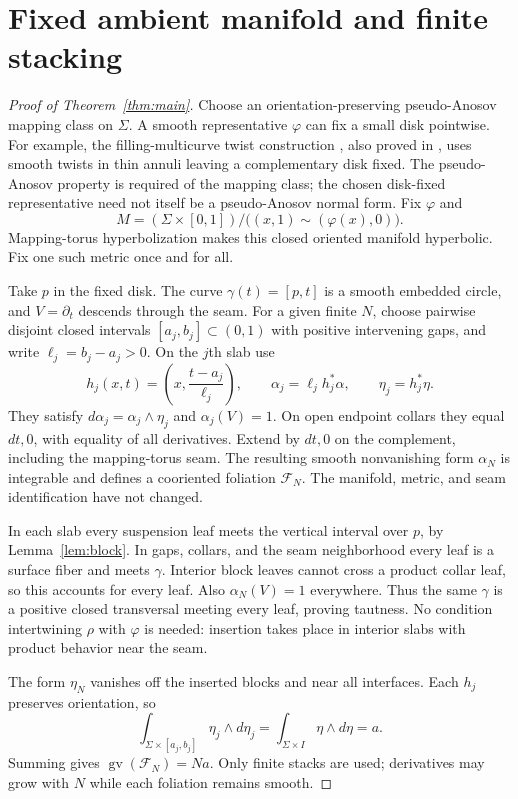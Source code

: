 \documentclass[11pt]{article}
\newcommand{\GV}{\operatorname{gv}}
\begin{document}
\section{Fixed ambient manifold and finite stacking}
\begin{proof}[Proof of Theorem~\ref{thm:main}]
Choose an orientation-preserving pseudo-Anosov mapping class on $\Sigma$.
A smooth representative $\varphi$ can fix a small disk pointwise.
For example, the filling-multicurve twist construction
\cite[Theorem~3.1]{P88}, also proved in \cite[pp.~467--468]{F92},
uses smooth twists in thin annuli leaving a complementary disk fixed.
The pseudo-Anosov property is required of the mapping class; the chosen
disk-fixed representative need not itself be a pseudo-Anosov normal form.
Fix $\varphi$ and
\[
 M=(\Sigma\times[0,1])/\bigl((x,1)\sim(\varphi(x),0)\bigr).
\]
Mapping-torus hyperbolization \cite[Theorem~0.1, Proposition~2.6,
\S5]{Th98} makes this closed oriented manifold hyperbolic.
Fix one such metric once and for all.

Take $p$ in the fixed disk. The curve $\gamma(t)=[p,t]$ is a smooth
embedded circle, and $V=\partial_t$ descends through the seam.
For a given finite $N$, choose pairwise disjoint closed intervals
$[a_j,b_j]\subset(0,1)$ with positive intervening gaps, and write
$\ell_j=b_j-a_j>0$. On the $j$th slab use
\[
 h_j(x,t)=\left(x,\frac{t-a_j}{\ell_j}\right),\qquad
 \alpha_j=\ell_j h_j^*\alpha,\qquad \eta_j=h_j^*\eta .
\]
They satisfy $d\alpha_j=\alpha_j\wedge\eta_j$ and
$\alpha_j(V)=1$. On open endpoint collars they equal $dt,0$,
with equality of all derivatives. Extend by $dt,0$ on the complement,
including the mapping-torus seam. The resulting smooth nonvanishing
form $\alpha_N$ is integrable and defines a cooriented foliation
$\mathcal F_N$. The manifold, metric, and seam identification have not
changed.

In each slab every suspension leaf meets the vertical interval over $p$,
by Lemma~\ref{lem:block}. In gaps, collars, and the seam neighborhood
every leaf is a surface fiber and meets $\gamma$. Interior block leaves
cannot cross a product collar leaf, so this accounts for every leaf.
Also $\alpha_N(V)=1$ everywhere. Thus the same $\gamma$ is a positive
closed transversal meeting every leaf, proving tautness.
No condition intertwining $\rho$ with $\varphi$ is needed: insertion
takes place in interior slabs with product behavior near the seam.

The form $\eta_N$ vanishes off the inserted blocks and near all
interfaces. Each $h_j$ preserves orientation, so
\[
 \int_{\Sigma\times[a_j,b_j]}\eta_j\wedge d\eta_j
       =\int_{\Sigma\times I}\eta\wedge d\eta=a .
\]
Summing gives $\GV(\mathcal F_N)=Na$. Only finite stacks are used;
derivatives may grow with $N$ while each foliation remains smooth.
\end{proof}
\end{document}
